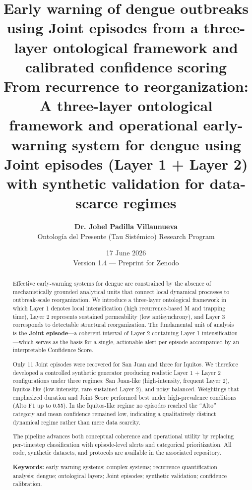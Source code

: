 \documentclass[11pt,a4paper]{article}
\title{\textbf{Early warning of dengue outbreaks using Joint episodes from a three-layer ontological framework and calibrated confidence scoring}\\[0.35em]
\large From recurrence to reorganization: A three-layer ontological framework and operational early-warning system for dengue using Joint episodes (Layer 1 + Layer 2) with synthetic validation for data-scarce regimes}
\author{
    \textbf{Dr. Johel Padilla Villaunueva} \\[0.25em]
    \small Ontolog\'ia del Presente (Tau Sist\'emico) Research Program
}
\date{17 June 2026 \\ \small Version 1.4 — Preprint for Zenodo}
\begin{document}
\maketitle

\begin{abstract}
\noindent Effective early-warning systems for dengue are constrained by the absence of mechanistically grounded analytical units that connect local dynamical processes to outbreak-scale reorganization. We introduce a three-layer ontological framework in which Layer 1 denotes local intensification (high recurrence-based M and trapping time), Layer 2 represents sustained permeability (low antisynchrony), and Layer 3 corresponds to detectable structural reorganization. The fundamental unit of analysis is the \textbf{Joint episode}—a coherent interval of Layer 2 containing Layer 1 intensification—which serves as the basis for a single, actionable alert per episode accompanied by an interpretable Confidence Score.

Only 11 Joint episodes were recovered for San Juan and three for Iquitos. We therefore developed a controlled synthetic generator producing realistic Layer 1 + Layer 2 configurations under three regimes: San Juan-like (high-intensity, frequent Layer 2), Iquitos-like (low-intensity, rare sustained Layer 2), and noisy balanced. Weightings that emphasized duration and Joint Score performed best under high-prevalence conditions (Alto F1 up to 0.55). In the Iquitos-like regime no episodes reached the ``Alto'' category and mean confidence remained low, indicating a qualitatively distinct dynamical regime rather than mere data scarcity.

The pipeline advances both conceptual coherence and operational utility by replacing per-timestep classification with episode-level alerts and categorical prioritization. All code, synthetic datasets, and protocols are available in the associated repository.

\vspace{0.2em}
\noindent\textbf{Keywords:} early warning systems; complex systems; recurrence quantification analysis; dengue; ontological layers; Joint episodes; synthetic validation; confidence calibration.
\end{abstract}
\end{document}
